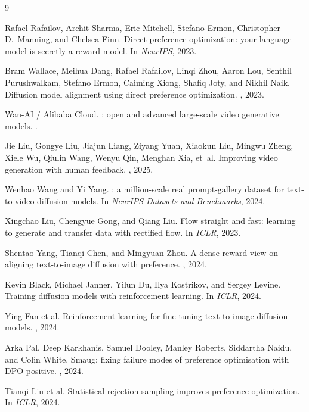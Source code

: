 \documentclass{article}
\begin{document}

\begin{thebibliography}{9}

Rafael Rafailov, Archit Sharma, Eric Mitchell, Stefano Ermon, Christopher D.\ Manning, and Chelsea Finn.
\newblock Direct preference optimization: your language model is secretly a reward model.
\newblock In {\em NeurIPS}, 2023.

Bram Wallace, Meihua Dang, Rafael Rafailov, Linqi Zhou, Aaron Lou, Senthil Purushwalkam, Stefano Ermon, Caiming Xiong, Shafiq Joty, and Nikhil Naik.
\newblock Diffusion model alignment using direct preference optimization.
, 2023.

Wan-AI / Alibaba Cloud.
: open and advanced large-scale video generative models.
.

Jie Liu, Gongye Liu, Jiajun Liang, Ziyang Yuan, Xiaokun Liu, Mingwu Zheng, Xiele Wu, Qiulin Wang, Wenyu Qin, Menghan Xia, et~al.
\newblock Improving video generation with human feedback.
, 2025.

Wenhao Wang and Yi Yang.
: a million-scale real prompt-gallery dataset for text-to-video diffusion models.
\newblock In {\em NeurIPS Datasets and Benchmarks}, 2024.

Xingchao Liu, Chengyue Gong, and Qiang Liu.
\newblock Flow straight and fast: learning to generate and transfer data with rectified flow.
\newblock In {\em ICLR}, 2023.

Shentao Yang, Tianqi Chen, and Mingyuan Zhou.
\newblock A dense reward view on aligning text-to-image diffusion with preference.
, 2024.

Kevin Black, Michael Janner, Yilun Du, Ilya Kostrikov, and Sergey Levine.
\newblock Training diffusion models with reinforcement learning.
\newblock In {\em ICLR}, 2024.

Ying Fan et al.
\newblock Reinforcement learning for fine-tuning text-to-image diffusion models.
, 2024.

Arka Pal, Deep Karkhanis, Samuel Dooley, Manley Roberts, Siddartha Naidu, and Colin White.
\newblock Smaug: fixing failure modes of preference optimisation with DPO-positive.
, 2024.

Tianqi Liu et al.
\newblock Statistical rejection sampling improves preference optimization.
\newblock In {\em ICLR}, 2024.

\end{thebibliography}
\end{document}
